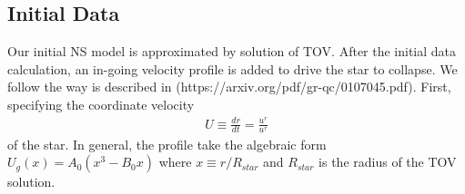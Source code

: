 \documentclass[prd]{revtex4}
\newcommand*\apost{\textsc{\char13}}
\begin{document}






\subsection{Initial Data}
Our initial NS model is approximated by solution of TOV. After the initial data calculation, an in-going velocity profile is added to drive the star to collapse. We follow the way is described in (https://arxiv.org/pdf/gr-qc/0107045.pdf). First, specifying the coordinate velocity
\begin{align}
U \equiv \frac{dr}{dt} = \frac{u^r}{u^r}
\end{align}
of the star. In general, the profile take the algebraic form $U_g(x) = A_0 (x^3 - B_0 x)$ where $x \equiv  r/R_{star}$ and $R_{star}$ is the radius of the TOV solution.
\end{document}
